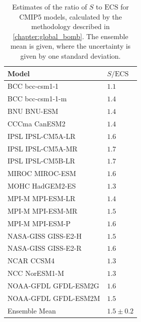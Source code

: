 \begin{table}
\centering
\begin{tabular}{ll} 
\toprule
  Model                              & $S/\mathrm{ECS}$                  \\
  \midrule
BCC bcc-csm1-1                     & $1.1$                               \\
BCC bcc-csm1-1-m                   & $1.4$                               \\
BNU BNU-ESM                        & $1.4$                               \\
CCCma CanESM2                      & $1.4$                               \\
IPSL IPSL-CM5A-LR                  & $1.6$                               \\
IPSL IPSL-CM5A-MR                  & $1.7$                               \\
IPSL IPSL-CM5B-LR                  & $1.7$                               \\
MIROC MIROC-ESM                    & $1.6$                               \\
MOHC HadGEM2-ES                    & $1.3$                               \\
MPI-M MPI-ESM-LR                   & $1.4$                               \\
MPI-M MPI-ESM-MR                   & $1.5$                               \\
MPI-M MPI-ESM-P                    & $1.6$                               \\
NASA-GISS GISS-E2-H                & $1.5$                               \\
NASA-GISS GISS-E2-R                & $1.6$                               \\
NCAR CCSM4                         & $1.3$                               \\
NCC NorESM1-M                      & $1.3$                               \\
NOAA-GFDL GFDL-ESM2G               & $1.6$                               \\
NOAA-GFDL GFDL-ESM2M               & $1.5$                               \\
Ensemble Mean                      & $1.5 \pm 0.2$                       \\
\bottomrule
\end{tabular}
\caption{Estimates of the ratio of $S$ to $\mathrm{ECS}$ for CMIP5 models, calculated by the methodology described in \cref{chapter:global_bomb}.
The ensemble mean is given, where the uncertainty is given by one standard deviation.}
\label{tab:S_vs_ECS}
\end{table}

